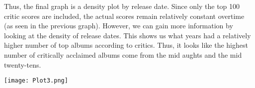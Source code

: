 \documentclass{article}
\begin{document}
\begin{enumerate}
    Thus, the final graph is a density plot by release date. Since only the top 100 critic scores are included, the actual scores remain relatively constant overtime (as seen in the previous graph). However, we can gain more information by looking at the density of release dates. This shows us what years had a relatively higher number of top albums according to critics. Thus, it looks like the highest number of critically acclaimed albums come from the mid aughts and the mid twenty-tens.

     \begin{center}
        \texttt{[image: Plot3.png]}
    \end{center}

\end{enumerate}
\end{document}
